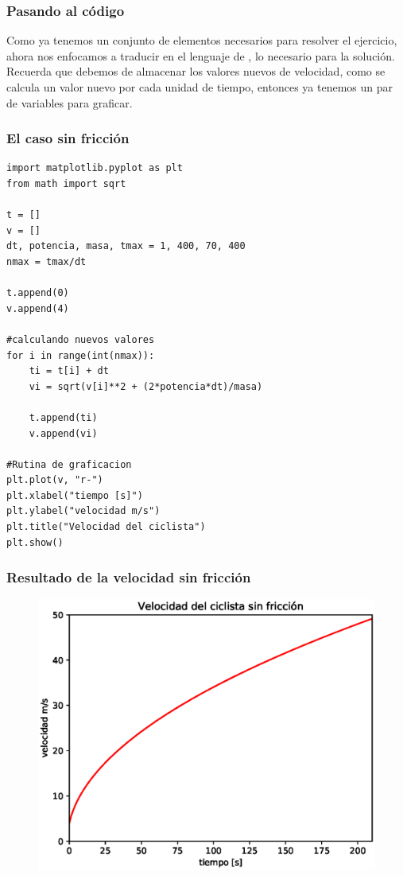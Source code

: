\begin{frame}
\frametitle{Pasando al código}
Como ya tenemos un conjunto de elementos necesarios para resolver el ejercicio, ahora nos enfocamos a traducir en el lenguaje de \python, lo necesario para la solución.
\\
\bigskip
Recuerda que debemos de almacenar los valores nuevos de velocidad, como se calcula un valor nuevo por cada unidad de tiempo, entonces ya tenemos un par de variables para graficar.
\end{frame}
\begin{frame}
\frametitle{El caso sin fricción}
\begin{lstlisting}[style=codigopython]
import matplotlib.pyplot as plt
from math import sqrt

t = []
v = []
dt, potencia, masa, tmax = 1, 400, 70, 400
nmax = tmax/dt

t.append(0)
v.append(4)

#calculando nuevos valores
for i in range(int(nmax)):
    ti = t[i] + dt
    vi = sqrt(v[i]**2 + (2*potencia*dt)/masa)
    
    t.append(ti)
    v.append(vi)

#Rutina de graficacion
plt.plot(v, "r-")
plt.xlabel("tiempo [s]")
plt.ylabel("velocidad m/s")
plt.title("Velocidad del ciclista")
plt.show()
\end{lstlisting}
\end{frame}
\begin{frame}
\frametitle{Resultado de la velocidad sin fricción}
\begin{figure}
	\centering
	\includegraphics[scale=0.6]{Imagenes/EjerBicicleta01.eps}
\end{figure}
\end{frame}
